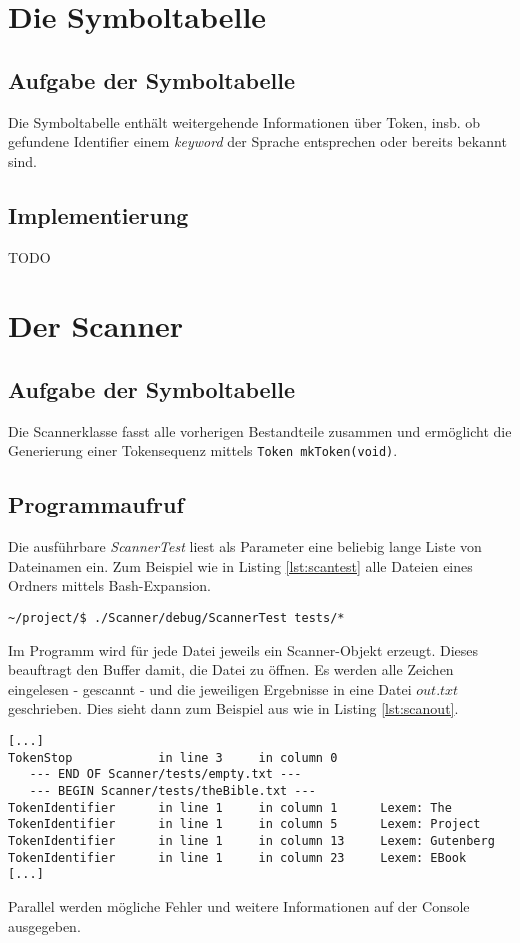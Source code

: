 \documentclass[
a4paper,   %
11pt,      %
oneside,   %
onecolumn, %
final      %
]{article}
\newcommand{\code}[1]{\lstinline$#1$}
\begin{document}
\section{Die Symboltabelle}

\subsection{Aufgabe der Symboltabelle}
Die Symboltabelle enthält weitergehende Informationen über Token, insb. ob gefundene Identifier einem \emph{keyword} der Sprache entsprechen oder bereits bekannt sind.

\subsection{Implementierung}
TODO


\section{Der Scanner}

\subsection{Aufgabe der Symboltabelle}
Die Scannerklasse fasst alle vorherigen Bestandteile zusammen und ermöglicht die Generierung einer Tokensequenz mittels \code{Token mkToken(void)}.


\subsection{Programmaufruf}
Die ausführbare \emph{ScannerTest} liest als Parameter eine beliebig lange Liste von Dateinamen ein. Zum Beispiel wie in Listing \ref{lst:scantest} alle Dateien eines Ordners mittels Bash-Expansion.
\begin{lstlisting}[language=PseudoCode, caption={Aufruf von ScannerTest}, label=lst:scantest]
~/project/$ ./Scanner/debug/ScannerTest tests/*
\end{lstlisting}
Im Programm wird für jede Datei jeweils ein Scanner-Objekt erzeugt. Dieses beauftragt den Buffer damit, die Datei zu öffnen. Es werden alle Zeichen eingelesen - gescannt - und die jeweiligen Ergebnisse in eine Datei $out.txt$ geschrieben. Dies sieht dann zum Beispiel aus wie in Listing \ref{lst:scanout}.
\begin{lstlisting}[language=PseudoCode, firstnumber=57, caption={Dateiausgabe von ScannerTest}, label=lst:scanout]
[...]
TokenStop            in line 3     in column 0
   --- END OF Scanner/tests/empty.txt ---
   --- BEGIN Scanner/tests/theBible.txt ---
TokenIdentifier	     in line 1     in column 1      Lexem: The
TokenIdentifier	     in line 1     in column 5      Lexem: Project
TokenIdentifier	     in line 1     in column 13     Lexem: Gutenberg
TokenIdentifier      in line 1     in column 23     Lexem: EBook
[...]
\end{lstlisting}
Parallel werden mögliche Fehler und weitere Informationen auf der Console ausgegeben.
\end{document}
